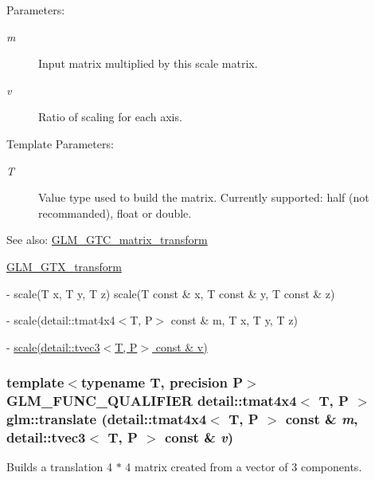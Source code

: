 \begin{Desc}
\item[Parameters:]
\begin{description}
\item[{\em m}]Input matrix multiplied by this scale matrix. \item[{\em v}]Ratio of scaling for each axis. \end{description}
\end{Desc}
\begin{Desc}
\item[Template Parameters:]
\begin{description}
\item[{\em T}]Value type used to build the matrix. Currently supported: half (not recommanded), float or double. \end{description}
\end{Desc}
\begin{Desc}
\item[See also:]\hyperlink{group__gtc__matrix__transform}{GLM\_\-GTC\_\-matrix\_\-transform} 

\hyperlink{group__gtx__transform}{GLM\_\-GTX\_\-transform} 

- scale(T x, T y, T z) scale(T const \& x, T const \& y, T const \& z) 

- scale(detail::tmat4x4$<$T, P$>$ const \& m, T x, T y, T z) 

- \hyperlink{group__gtx__transform_g70f2d33f150672b9faca3b477fcca2c4}{scale(detail::tvec3$<$T, P$>$ const \& v)} \end{Desc}
\hypertarget{group__gtc__matrix__transform_gb05e6ebabf535a3d8f9d9bfc3df45143}{
\subsubsection[translate]{\setlength{\rightskip}{0pt plus 5cm}template$<$typename T, precision P$>$ GLM\_\-FUNC\_\-QUALIFIER detail::tmat4x4$<$ T, P $>$ glm::translate (detail::tmat4x4$<$ T, P $>$ const \& {\em m}, \/  detail::tvec3$<$ T, P $>$ const \& {\em v})}}
\label{group__gtc__matrix__transform_gb05e6ebabf535a3d8f9d9bfc3df45143}


Builds a translation 4 $\ast$ 4 matrix created from a vector of 3 components.

